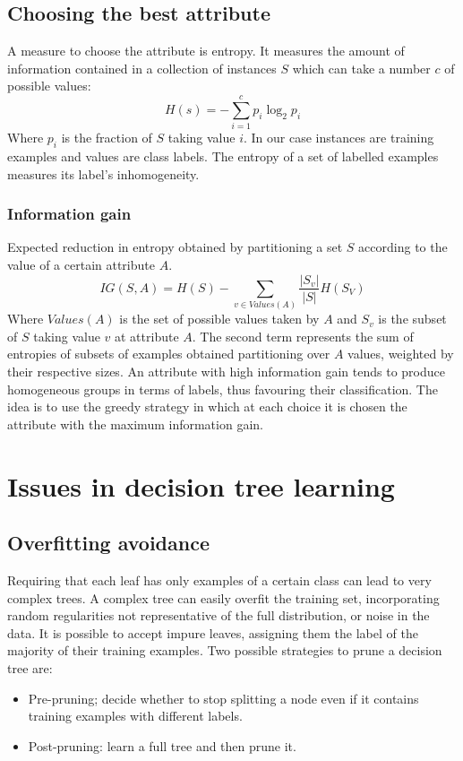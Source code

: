 	\subsection{Choosing the best attribute}
	A measure to choose the attribute is entropy.
	It measures the amount of information contained in a collection of instances $S$ which can take a number $c$ of possible  values:
	$$H(s) = -\sum\limits_{i=1}^c p_i\log_2 p_i$$
	Where $p_i$ is the fraction of $S$ taking value $i$.
	In our case instances are training examples and values are class labels.
	The entropy of a set of labelled examples measures its label's inhomogeneity.

		\subsubsection{Information gain}
		Expected reduction in entropy obtained by partitioning a set $S$ according to the value of a certain attribute $A$.
		$$IG(S,A) = H(S) - \sum\limits_{v\in Values(A)}\dfrac{|S_v|}{|S|}H(S_V)$$
		Where $Values(A)$ is the set of possible values taken by $A$ and $S_v$ is the subset of $S$ taking value $v$ at attribute $A$.
		The second term represents the sum of entropies of subsets of examples obtained partitioning over $A$ values, weighted by their respective sizes.
		An attribute with high information gain tends to produce homogeneous groups in terms of labels, thus favouring their classification.
		The idea is to use the greedy strategy in which at each choice it is chosen the attribute with the maximum information gain.

\section{Issues in decision tree learning}
	\subsection{Overfitting avoidance}
	Requiring that each leaf has only examples of a certain class can lead to very complex trees.
	A complex tree can easily overfit the training set, incorporating random regularities not representative of the full distribution, or noise in the data.
	It is possible to accept impure leaves, assigning them the label of the majority of their training examples.
	Two possible strategies to prune a decision tree are:
	\begin{itemize}
		\item Pre-pruning; decide whether to stop splitting a node even if it contains training examples with different labels.
		\item Post-pruning: learn a full tree and then prune it.
	\end{itemize}

